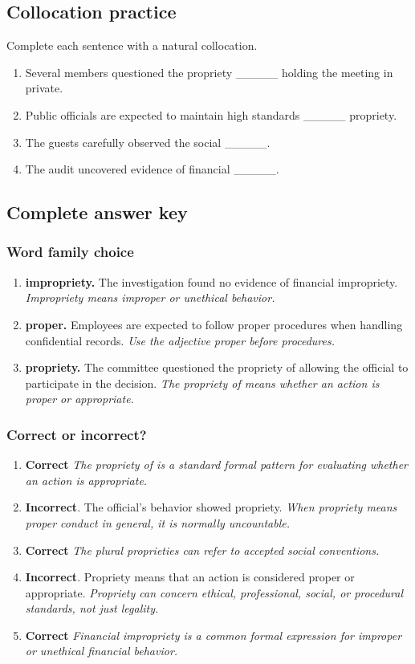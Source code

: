 \documentclass[11pt]{article}
\begin{document}
\subsection{Collocation practice}
Complete each sentence with a natural collocation.

\begin{enumerate}
  \item Several members questioned the propriety \_\_\_\_\_ holding the meeting in private.
  \item Public officials are expected to maintain high standards \_\_\_\_\_ propriety.
  \item The guests carefully observed the social \_\_\_\_\_.
  \item The audit uncovered evidence of financial \_\_\_\_\_.
\end{enumerate}

\subsection{Complete answer key}
\subsubsection{Word family choice}
\begin{enumerate}
  \item \textbf{impropriety.} The investigation found no evidence of financial impropriety. \emph{Impropriety means improper or unethical behavior.}
  \item \textbf{proper.} Employees are expected to follow proper procedures when handling confidential records. \emph{Use the adjective proper before procedures.}
  \item \textbf{propriety.} The committee questioned the propriety of allowing the official to participate in the decision. \emph{The propriety of means whether an action is proper or appropriate.}
\end{enumerate}

\subsubsection{Correct or incorrect?}
\begin{enumerate}
  \item \textbf{Correct} \emph{The propriety of is a standard formal pattern for evaluating whether an action is appropriate.}
  \item \textbf{Incorrect}. The official's behavior showed propriety. \emph{When propriety means proper conduct in general, it is normally uncountable.}
  \item \textbf{Correct} \emph{The plural proprieties can refer to accepted social conventions.}
  \item \textbf{Incorrect}. Propriety means that an action is considered proper or appropriate. \emph{Propriety can concern ethical, professional, social, or procedural standards, not just legality.}
  \item \textbf{Correct} \emph{Financial impropriety is a common formal expression for improper or unethical financial behavior.}
\end{enumerate}
\end{document}
